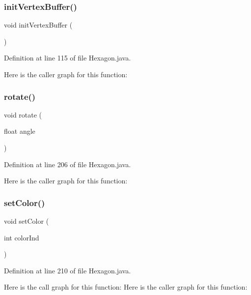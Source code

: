 \subsubsection{init\+Vertex\+Buffer()}
{\footnotesize\ttfamily void init\+Vertex\+Buffer (\begin{DoxyParamCaption}{ }\end{DoxyParamCaption})}



Definition at line 115 of file Hexagon.\+java.

Here is the caller graph for this function\+:
\mbox{\label{classru_1_1litun_1_1unitingtwist_1_1_hexagon_a523014438b1a8318ec0915c2ce0a3430}} 
\subsubsection{rotate()}
{\footnotesize\ttfamily void rotate (\begin{DoxyParamCaption}\item[{float}]{angle }\end{DoxyParamCaption})}



Definition at line 206 of file Hexagon.\+java.

Here is the caller graph for this function\+:
\mbox{\label{classru_1_1litun_1_1unitingtwist_1_1_hexagon_a1cc9d5666b1d32b3e35f88192b3b4d3f}} 
\subsubsection{set\+Color()}
{\footnotesize\ttfamily void set\+Color (\begin{DoxyParamCaption}\item[{int}]{color\+Ind }\end{DoxyParamCaption})}



Definition at line 210 of file Hexagon.\+java.

Here is the call graph for this function\+:
Here is the caller graph for this function\+:
\mbox{\label{classru_1_1litun_1_1unitingtwist_1_1_hexagon_aaf32fd3f86bbef7279898dd958c847cd}} 
